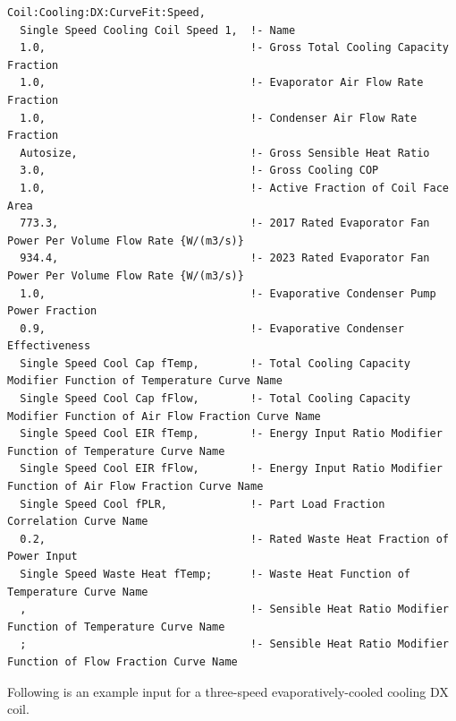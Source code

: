 \begin{lstlisting}
Coil:Cooling:DX:CurveFit:Speed,
  Single Speed Cooling Coil Speed 1,  !- Name
  1.0,                                !- Gross Total Cooling Capacity Fraction
  1.0,                                !- Evaporator Air Flow Rate Fraction
  1.0,                                !- Condenser Air Flow Rate Fraction
  Autosize,                           !- Gross Sensible Heat Ratio
  3.0,                                !- Gross Cooling COP
  1.0,                                !- Active Fraction of Coil Face Area
  773.3,                              !- 2017 Rated Evaporator Fan Power Per Volume Flow Rate {W/(m3/s)}
  934.4,                              !- 2023 Rated Evaporator Fan Power Per Volume Flow Rate {W/(m3/s)}
  1.0,                                !- Evaporative Condenser Pump Power Fraction
  0.9,                                !- Evaporative Condenser Effectiveness
  Single Speed Cool Cap fTemp,        !- Total Cooling Capacity Modifier Function of Temperature Curve Name
  Single Speed Cool Cap fFlow,        !- Total Cooling Capacity Modifier Function of Air Flow Fraction Curve Name
  Single Speed Cool EIR fTemp,        !- Energy Input Ratio Modifier Function of Temperature Curve Name
  Single Speed Cool EIR fFlow,        !- Energy Input Ratio Modifier Function of Air Flow Fraction Curve Name
  Single Speed Cool fPLR,             !- Part Load Fraction Correlation Curve Name
  0.2,                                !- Rated Waste Heat Fraction of Power Input
  Single Speed Waste Heat fTemp;      !- Waste Heat Function of Temperature Curve Name
  ,                                   !- Sensible Heat Ratio Modifier Function of Temperature Curve Name
  ;                                   !- Sensible Heat Ratio Modifier Function of Flow Fraction Curve Name

\end{lstlisting}

Following is an example input for a three-speed evaporatively-cooled cooling DX coil.

